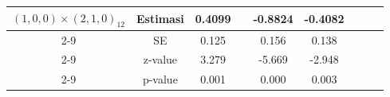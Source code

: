 \begin{enumerate}[label=\alph*.]
\begin{longtable}{|c|c|c|c|c|c|c|c|c|}
            \multirow{4}{*}{$(1,0,0)\times(2,1,0)_{12}$}
            & Estimasi & 0.4099 & {} & -0.8824 & -0.4082 & {} & {} & {}\\ \cline{2-9}
            & SE       & 0.125 & {} & 0.156 & 0.138 & {} & {} & {}\\ \cline{2-9}
            & z-value  & 3.279 & {} & -5.669 & -2.948 & {} & {}& {}\\ \cline{2-9}
            & p-value  & 0.001 & {} & 0.000 & 0.003 & {} & {} & {}\\ \hline
        \end{longtable}
        \normalsize
\end{enumerate}